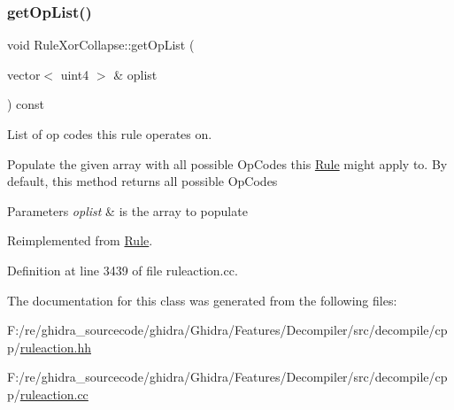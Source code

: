 \subsubsection{\texorpdfstring{getOpList()}{getOpList()}}
{\footnotesize\ttfamily void Rule\+Xor\+Collapse\+::get\+Op\+List (\begin{DoxyParamCaption}\item[{vector$<$ uint4 $>$ \&}]{oplist }\end{DoxyParamCaption}) const\hspace{0.3cm}{\ttfamily [virtual]}}



List of op codes this rule operates on. 

Populate the given array with all possible Op\+Codes this \mbox{\hyperlink{class_rule}{Rule}} might apply to. By default, this method returns all possible Op\+Codes 
\begin{DoxyParams}{Parameters}
{\em oplist} & is the array to populate \\
\hline
\end{DoxyParams}


Reimplemented from \mbox{\hyperlink{class_rule_a4023bfc7825de0ab866790551856d10e}{Rule}}.



Definition at line 3439 of file ruleaction.\+cc.



The documentation for this class was generated from the following files\+:\begin{DoxyCompactItemize}
\item 
F\+:/re/ghidra\+\_\+sourcecode/ghidra/\+Ghidra/\+Features/\+Decompiler/src/decompile/cpp/\mbox{\hyperlink{ruleaction_8hh}{ruleaction.\+hh}}\item 
F\+:/re/ghidra\+\_\+sourcecode/ghidra/\+Ghidra/\+Features/\+Decompiler/src/decompile/cpp/\mbox{\hyperlink{ruleaction_8cc}{ruleaction.\+cc}}\end{DoxyCompactItemize}
